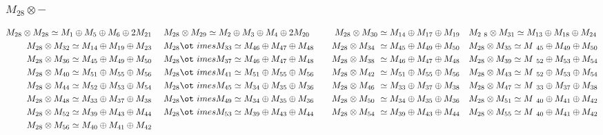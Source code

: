 \subsubsection{$M_28\otimes -$}
\begin{align*}
M_{28} \otimes M_{28} \simeq M_{1} \oplus M_{5} \oplus M_{6} \oplus 2 M_{21} &\
&& M_{28} \otimes M_{29} \simeq M_{2} \oplus M_{3} \oplus M_{4} \oplus 2 M_{20\
} &&& M_{28} \otimes M_{30} \simeq M_{14} \oplus M_{17} \oplus M_{19} &&& M_{2\
8} \otimes M_{31} \simeq M_{13} \oplus M_{18} \oplus M_{24}\\
M_{28} \otimes M_{32} \simeq M_{14} \oplus M_{19} \oplus M_{23} &&& M_{28} \ot\
imes M_{33} \simeq M_{46} \oplus M_{47} \oplus M_{48} &&& M_{28} \otimes M_{34\
} \simeq M_{45} \oplus M_{49} \oplus M_{50} &&& M_{28} \otimes M_{35} \simeq M\
_{45} \oplus M_{49} \oplus M_{50}\\
M_{28} \otimes M_{36} \simeq M_{45} \oplus M_{49} \oplus M_{50} &&& M_{28} \ot\
imes M_{37} \simeq M_{46} \oplus M_{47} \oplus M_{48} &&& M_{28} \otimes M_{38\
} \simeq M_{46} \oplus M_{47} \oplus M_{48} &&& M_{28} \otimes M_{39} \simeq M\
_{52} \oplus M_{53} \oplus M_{54}\\
M_{28} \otimes M_{40} \simeq M_{51} \oplus M_{55} \oplus M_{56} &&& M_{28} \ot\
imes M_{41} \simeq M_{51} \oplus M_{55} \oplus M_{56} &&& M_{28} \otimes M_{42\
} \simeq M_{51} \oplus M_{55} \oplus M_{56} &&& M_{28} \otimes M_{43} \simeq M\
_{52} \oplus M_{53} \oplus M_{54}\\
M_{28} \otimes M_{44} \simeq M_{52} \oplus M_{53} \oplus M_{54} &&& M_{28} \ot\
imes M_{45} \simeq M_{34} \oplus M_{35} \oplus M_{36} &&& M_{28} \otimes M_{46\
} \simeq M_{33} \oplus M_{37} \oplus M_{38} &&& M_{28} \otimes M_{47} \simeq M\
_{33} \oplus M_{37} \oplus M_{38}\\
M_{28} \otimes M_{48} \simeq M_{33} \oplus M_{37} \oplus M_{38} &&& M_{28} \ot\
imes M_{49} \simeq M_{34} \oplus M_{35} \oplus M_{36} &&& M_{28} \otimes M_{50\
} \simeq M_{34} \oplus M_{35} \oplus M_{36} &&& M_{28} \otimes M_{51} \simeq M\
_{40} \oplus M_{41} \oplus M_{42}\\
M_{28} \otimes M_{52} \simeq M_{39} \oplus M_{43} \oplus M_{44} &&& M_{28} \ot\
imes M_{53} \simeq M_{39} \oplus M_{43} \oplus M_{44} &&& M_{28} \otimes M_{54\
} \simeq M_{39} \oplus M_{43} \oplus M_{44} &&& M_{28} \otimes M_{55} \simeq M\
_{40} \oplus M_{41} \oplus M_{42}\\
M_{28} \otimes M_{56} \simeq M_{40} \oplus M_{41} \oplus M_{42}\\
\end{align*}

